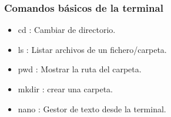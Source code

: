 \documentclass{beamer}
\begin{document}
	
	\begin{frame}
		\frametitle{Comandos básicos de la terminal}
		
		\begin{tcolorbox}[enhanced, title= Instrucciones:]
			\begin{itemize}
				\item cd  : Cambiar de directorio.
				\item ls  : Listar archivos de un fichero/carpeta.
				\item pwd : Mostrar la ruta del carpeta.
				\item mkdir : crear una carpeta.
				\item nano : Gestor de texto desde la terminal. 
			\end{itemize}
		\end{tcolorbox}
		
	\end{frame}
	
\end{document}
